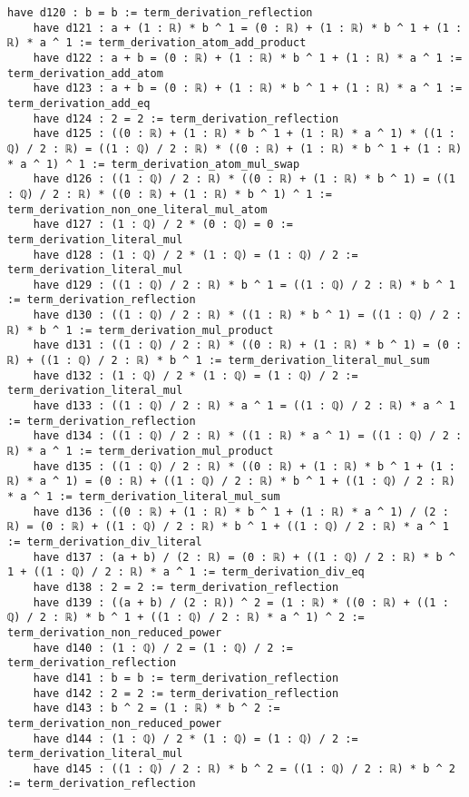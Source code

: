 \documentclass{article}
\begin{document}
\begin{tcolorbox}[colback=white!10, width=\linewidth]
\begin{lstlisting}[language=Lean4]
    have d120 : b = b := term_derivation_reflection
    have d121 : a + (1 : ℝ) * b ^ 1 = (0 : ℝ) + (1 : ℝ) * b ^ 1 + (1 : ℝ) * a ^ 1 := term_derivation_atom_add_product
    have d122 : a + b = (0 : ℝ) + (1 : ℝ) * b ^ 1 + (1 : ℝ) * a ^ 1 := term_derivation_add_atom
    have d123 : a + b = (0 : ℝ) + (1 : ℝ) * b ^ 1 + (1 : ℝ) * a ^ 1 := term_derivation_add_eq
    have d124 : 2 = 2 := term_derivation_reflection
    have d125 : ((0 : ℝ) + (1 : ℝ) * b ^ 1 + (1 : ℝ) * a ^ 1) * ((1 : ℚ) / 2 : ℝ) = ((1 : ℚ) / 2 : ℝ) * ((0 : ℝ) + (1 : ℝ) * b ^ 1 + (1 : ℝ) * a ^ 1) ^ 1 := term_derivation_atom_mul_swap
    have d126 : ((1 : ℚ) / 2 : ℝ) * ((0 : ℝ) + (1 : ℝ) * b ^ 1) = ((1 : ℚ) / 2 : ℝ) * ((0 : ℝ) + (1 : ℝ) * b ^ 1) ^ 1 := term_derivation_non_one_literal_mul_atom
    have d127 : (1 : ℚ) / 2 * (0 : ℚ) = 0 := term_derivation_literal_mul
    have d128 : (1 : ℚ) / 2 * (1 : ℚ) = (1 : ℚ) / 2 := term_derivation_literal_mul
    have d129 : ((1 : ℚ) / 2 : ℝ) * b ^ 1 = ((1 : ℚ) / 2 : ℝ) * b ^ 1 := term_derivation_reflection
    have d130 : ((1 : ℚ) / 2 : ℝ) * ((1 : ℝ) * b ^ 1) = ((1 : ℚ) / 2 : ℝ) * b ^ 1 := term_derivation_mul_product
    have d131 : ((1 : ℚ) / 2 : ℝ) * ((0 : ℝ) + (1 : ℝ) * b ^ 1) = (0 : ℝ) + ((1 : ℚ) / 2 : ℝ) * b ^ 1 := term_derivation_literal_mul_sum
    have d132 : (1 : ℚ) / 2 * (1 : ℚ) = (1 : ℚ) / 2 := term_derivation_literal_mul
    have d133 : ((1 : ℚ) / 2 : ℝ) * a ^ 1 = ((1 : ℚ) / 2 : ℝ) * a ^ 1 := term_derivation_reflection
    have d134 : ((1 : ℚ) / 2 : ℝ) * ((1 : ℝ) * a ^ 1) = ((1 : ℚ) / 2 : ℝ) * a ^ 1 := term_derivation_mul_product
    have d135 : ((1 : ℚ) / 2 : ℝ) * ((0 : ℝ) + (1 : ℝ) * b ^ 1 + (1 : ℝ) * a ^ 1) = (0 : ℝ) + ((1 : ℚ) / 2 : ℝ) * b ^ 1 + ((1 : ℚ) / 2 : ℝ) * a ^ 1 := term_derivation_literal_mul_sum
    have d136 : ((0 : ℝ) + (1 : ℝ) * b ^ 1 + (1 : ℝ) * a ^ 1) / (2 : ℝ) = (0 : ℝ) + ((1 : ℚ) / 2 : ℝ) * b ^ 1 + ((1 : ℚ) / 2 : ℝ) * a ^ 1 := term_derivation_div_literal
    have d137 : (a + b) / (2 : ℝ) = (0 : ℝ) + ((1 : ℚ) / 2 : ℝ) * b ^ 1 + ((1 : ℚ) / 2 : ℝ) * a ^ 1 := term_derivation_div_eq
    have d138 : 2 = 2 := term_derivation_reflection
    have d139 : ((a + b) / (2 : ℝ)) ^ 2 = (1 : ℝ) * ((0 : ℝ) + ((1 : ℚ) / 2 : ℝ) * b ^ 1 + ((1 : ℚ) / 2 : ℝ) * a ^ 1) ^ 2 := term_derivation_non_reduced_power
    have d140 : (1 : ℚ) / 2 = (1 : ℚ) / 2 := term_derivation_reflection
    have d141 : b = b := term_derivation_reflection
    have d142 : 2 = 2 := term_derivation_reflection
    have d143 : b ^ 2 = (1 : ℝ) * b ^ 2 := term_derivation_non_reduced_power
    have d144 : (1 : ℚ) / 2 * (1 : ℚ) = (1 : ℚ) / 2 := term_derivation_literal_mul
    have d145 : ((1 : ℚ) / 2 : ℝ) * b ^ 2 = ((1 : ℚ) / 2 : ℝ) * b ^ 2 := term_derivation_reflection

\end{lstlisting}
\end{tcolorbox}
\end{document}
